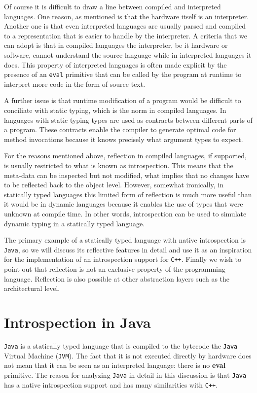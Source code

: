 Of course it is difficult to draw a line between compiled and interpreted languages. One reason, as mentioned is that the hardware
itself is an interpreter. Another one is that even interpreted languages are usually parsed and compiled to a representation that is
easier to handle by the interpreter. A criteria that we can adopt is that in compiled languages the interpreter, be it hardware
or software, cannot understand the source language while in interpreted languages it does. This property of interpreted
languages is often made explicit by the presence of an \texttt{eval} primitive that can be called by the program at runtime
to interpret more code in the form of source text.

A further issue is that runtime modification of a program would be difficult to conciliate with static typing, which is the norm
in compiled languages. In languages with static typing types are used as contracts between different parts of a program. 
These contracts enable the compiler to generate optimal code for method invocations because it knows precisely what argument
types to expect.

For the reasons mentioned above, reflection in compiled languages, if supported, is usually restricted to what is known
as introspection. This means that the meta-data can be inspected but not modified, what implies that no changes
have to be reflected back to the object level. However, somewhat ironically, in statically typed languages this
limited form of reflection is much more useful than it would be in dynamic languages because it enables the use of types
that were unknown at compile time. In other words, introspection can be used to simulate dynamic typing in a statically typed language.

The primary example of a statically typed language with native introspection is \texttt{Java}, so we will discuss its reflective features in detail
and use it as an inspiration for the implementation of an introspection support for \texttt{C++}. Finally we wish to point out that reflection
is not an exclusive property of the programming language. Reflection is also possible at other abstraction layers such as the architectural
level.


\section{Introspection in Java}

\texttt{Java} is a statically typed language that is compiled to the bytecode the \texttt{Java} Virtual Machine (\texttt{JVM}). The fact that it is not executed
directly by hardware does not mean that it can be seen as an interpreted language: there is no \textbf{eval} primitive.
The reason for analyzing \texttt{Java} in detail in this discussion is that \texttt{Java} has a native introspection support and has many
similarities with \texttt{C++}.

